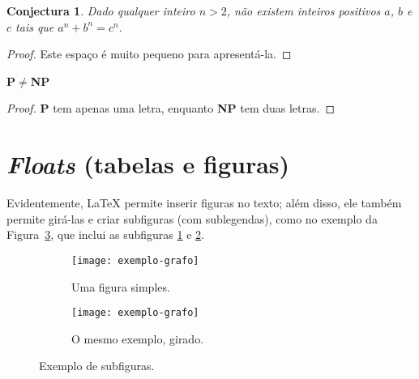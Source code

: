 \theoremstyle{maybe} %
\newtheorem{conjecture}{Conjectura}

\begin{conjecture}
  \label{conj:fermat}
  Dado qualquer inteiro $n > 2$, não existem inteiros positivos
  $a$, $b$ e $c$ tais que $a^n + b^n = c^n$.
\end{conjecture}

\begin{proof}
  Este espaço é muito pequeno para apresentá-la.
  \renewcommand\qedsymbol{}
\end{proof}

\begin{theorem}
  \label{thm:pnp}
  \textup{\textsf{\textbf{P$\ne$NP}}}
\end{theorem}

\begin{proof}
  \textsf{\textbf{P}} tem apenas uma letra, enquanto
  \textsf{\textbf{NP}} tem duas letras.
\end{proof}

\section{\emph{Floats} (tabelas e figuras)}

Evidentemente, \LaTeX{} permite inserir figuras no texto; além disso, ele
também permite girá-las e criar subfiguras (com sublegendas),
como no exemplo da Figura~\ref{fig:subfigures}, que inclui
as subfiguras \ref{fig:subfigures:a} e \ref{fig:subfigures:b}.


\begin{figure}
  \centering

  \begin{subfigure}{0.4\textwidth}
    \centering
    \texttt{[image: exemplo-grafo]}
    \caption{Uma figura simples.\label{fig:subfigures:a}}
  \end{subfigure}
  \begin{subfigure}{0.4\textwidth}
    \centering
    \begin{turn}{90}
      \texttt{[image: exemplo-grafo]}
    \end{turn}
    \caption{O mesmo exemplo, girado.\label{fig:subfigures:b}}
  \end{subfigure}

  \caption{Exemplo de subfiguras.\label{fig:subfigures}}
\end{figure}

